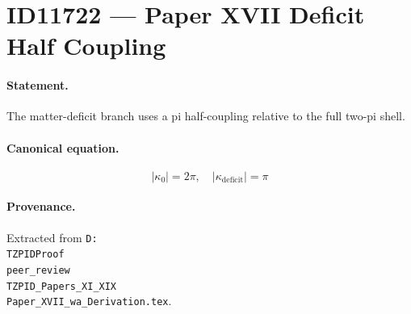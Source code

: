 \section*{ID11722 --- Paper XVII Deficit Half Coupling}

\paragraph{Statement.}
The matter-deficit branch uses a pi half-coupling relative to the full two-pi shell.

\paragraph{Canonical equation.}
\[
|\kappa_0|=2\pi,\quad |\kappa_{\mathrm{deficit}}|=\pi
\]

\paragraph{Provenance.}
Extracted from \texttt{D:\\TZPIDProof\\peer\_review\\TZPID\_Papers\_XI\_XIX\\Paper\_XVII\_wa\_Derivation.tex}.
